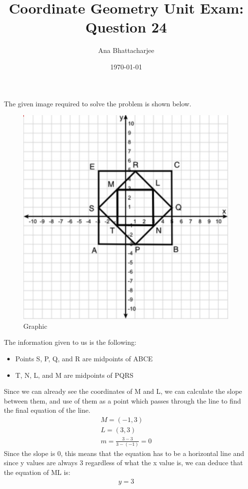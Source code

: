 \documentclass{article}
\begin{document}
\title{Coordinate Geometry Unit Exam: Question 24}
\author{Ana Bhattacharjee}
\date{\today}
\maketitle{}

\begin{center}
The given image required to solve the problem is shown below.
\begin{figure}[!htbp]
  \includegraphics[width=0.9\columnwidth]{q24_figure}
  \caption{Graphic}
\end{figure}
\par
The information given to us is the following:
\begin{itemize}
  \item Points S, P, Q, and R are midpoints of ABCE
  \item T, N, L, and M are midpoints of PQRS
\end{itemize}
\newpage
Since we can already see the coordinates of M and L, we can calculate the slope between them, and use of them as a point which passes through the line to find the final equation of the line.
\begin{align}
  M = (-1, 3) \\
  L = (3, 3) \\
  m = \frac{3 - 3}{3 - (-1)} = 0
\end{align}
Since the slope is 0, this means that the equation has to be a horizontal line and since y values are always 3 regardless of what the x value is, we can deduce that the equation of ML is:
\begin{align}
  y = 3 
\end{align}
\end{center}
\end{document}
